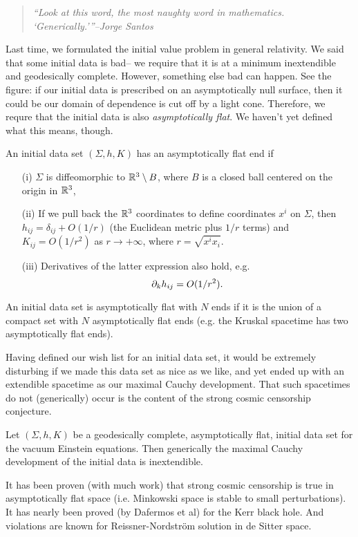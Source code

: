 \begin{quote}
    \textit{``Look at this word, the most naughty word in mathematics. `Generically.'{}''--Jorge Santos}
\end{quote}

Last time, we formulated the initial value problem in general relativity. We said that some initial data is bad-- we require that it is at a minimum inextendible and geodesically complete. However, something else bad can happen. See the figure:
if our initial data is prescribed on an asymptotically null surface, then it could be our domain of dependence is cut off by a light cone. Therefore, we requre that the initial data is also \emph{asymptotically flat}. We haven't yet defined what this means, though.

\begin{defn}
    An initial data set $(\Sigma,h,K)$ has an asymptotically flat end if
    \begin{itemize}
        \item[(i)] $\Sigma$ is diffeomorphic to $\mathbb{R}^3 \setminus B$, where $B$ is a closed ball centered on the origin in $\mathbb{R}^3$,
        \item[(ii)] If we pull back the $\mathbb{R}^3$ coordinates to define coordinates $x^i$ on $\Sigma$, then $h_{ij}=\delta_{ij}+O(1/r)$ (the Euclidean metric plus $1/r$ terms) and $K_{ij}=O(1/r^2)$ as $r\to +\infty$, where $r=\sqrt{x^i x_i}$.
        \item[(iii)] Derivatives of the latter expression also hold, e.g.
        \begin{equation*}
            \partial_k h_{ij}=O(1/r^2).
        \end{equation*}
    \end{itemize}
\end{defn}
\begin{defn}
    An initial data set is asymptotically flat with $N$ ends if it is the union of a compact set with $N$ asymptotically flat ends (e.g. the Kruskal spacetime has two asymptotically flat ends).
\end{defn}
Having defined our wish list for an initial data set, it would be extremely disturbing if we made this data set as nice as we like, and yet ended up with an extendible spacetime as our maximal Cauchy development. That such spacetimes do not (generically) occur is the content of the strong cosmic censorship conjecture.
\begin{thm}
    Let $(\Sigma,h,K)$ be a geodesically complete, asymptotically flat, initial data set for the vacuum Einstein equations. Then generically the maximal Cauchy development of the initial data is inextendible.
\end{thm}
It has been proven (with much work) that strong cosmic censorship is true in asymptotically flat space (i.e. Minkowski space is stable to small perturbations). It has nearly been proved (by Dafermos et al) for the Kerr black hole. And violations are known for Reissner-Nordstr\"om solution in de Sitter space.

